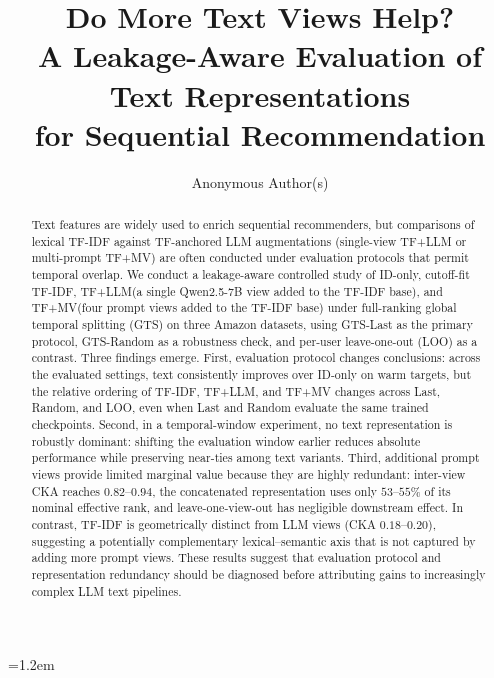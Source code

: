 \documentclass[sigconf,natbib=true,anonymous]{acmart}
\newcommand{\tfidf}{\textsc{TF-IDF}\xspace}
\newcommand{\tfllm}{\textsc{TF+LLM}\xspace}
\newcommand{\tfmv}{\textsc{TF+MV}\xspace}
\begin{document}
\emergencystretch=1.2em

\title{Do More Text Views Help?\\
A Leakage-Aware Evaluation of Text Representations\\
for Sequential Recommendation}

\author{Anonymous Author(s)}
\renewcommand{\shortauthors}{Anonymous}

\begin{abstract}
Text features are widely used to enrich sequential recommenders, but comparisons of lexical \tfidf against TF-anchored LLM augmentations (single-view \tfllm or multi-prompt \tfmv) are often conducted under evaluation protocols that permit temporal overlap.
We conduct a leakage-aware controlled study of ID-only, cutoff-fit \tfidf, \tfllm (a single Qwen2.5-7B view added to the \tfidf base), and \tfmv (four prompt views added to the \tfidf base) under full-ranking global temporal splitting (GTS) on three Amazon datasets, using GTS-Last as the primary protocol, GTS-Random as a robustness check, and per-user leave-one-out (LOO) as a contrast.
Three findings emerge.
First, evaluation protocol changes conclusions: across the evaluated settings, text consistently improves over ID-only on warm targets, but the relative ordering of \tfidf, \tfllm, and \tfmv changes across Last, Random, and LOO, even when Last and Random evaluate the same trained checkpoints.
Second, in a temporal-window experiment, no text representation is robustly dominant: shifting the evaluation window earlier reduces absolute performance while preserving near-ties among text variants.
Third, additional prompt views provide limited marginal value because they are highly redundant: inter-view CKA reaches $0.82$--$0.94$, the concatenated representation uses only $53$--$55\%$ of its nominal effective rank, and leave-one-view-out has negligible downstream effect.
In contrast, TF-IDF is geometrically distinct from LLM views (CKA $0.18$--$0.20$), suggesting a potentially complementary lexical--semantic axis that is not captured by adding more prompt views.
These results suggest that evaluation protocol and representation redundancy should be diagnosed before attributing gains to increasingly complex LLM text pipelines.
\end{abstract}
\end{document}
